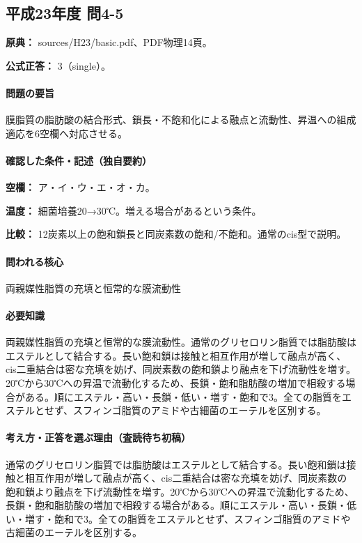 \subsection{平成23年度 問4-5}
\label{q:h23-reg-basic-4-5}

\noindent\textbf{原典：} sources/H23/basic.pdf、PDF物理14頁。

\textbf{公式正答：} 3（single）。

\paragraph{問題の要旨} 膜脂質の脂肪酸の結合形式、鎖長・不飽和化による融点と流動性、昇温への組成適応を6空欄へ対応させる。

\paragraph{確認した条件・記述（独自要約）}\mbox{}\par

\noindent\textbf{空欄：} ア・イ・ウ・エ・オ・カ。\par

\noindent\textbf{温度：} 細菌培養20→30℃。増える場合があるという条件。\par

\noindent\textbf{比較：} 12炭素以上の飽和鎖長と同炭素数の飽和/不飽和。通常のcis型で説明。\par

\paragraph{問われる核心} 両親媒性脂質の充填と恒常的な膜流動性

\paragraph{必要知識} 両親媒性脂質の充填と恒常的な膜流動性。通常のグリセロリン脂質では脂肪酸はエステルとして結合する。長い飽和鎖は接触と相互作用が増して融点が高く、cis二重結合は密な充填を妨げ、同炭素数の飽和鎖より融点を下げ流動性を増す。20℃から30℃への昇温で流動化するため、長鎖・飽和脂肪酸の増加で相殺する場合がある。順にエステル・高い・長鎖・低い・増す・飽和で3。全ての脂質をエステルとせず、スフィンゴ脂質のアミドや古細菌のエーテルを区別する。

\paragraph{考え方・正答を選ぶ理由（査読待ち初稿）} 通常のグリセロリン脂質では脂肪酸はエステルとして結合する。長い飽和鎖は接触と相互作用が増して融点が高く、cis二重結合は密な充填を妨げ、同炭素数の飽和鎖より融点を下げ流動性を増す。20℃から30℃への昇温で流動化するため、長鎖・飽和脂肪酸の増加で相殺する場合がある。順にエステル・高い・長鎖・低い・増す・飽和で3。全ての脂質をエステルとせず、スフィンゴ脂質のアミドや古細菌のエーテルを区別する。

